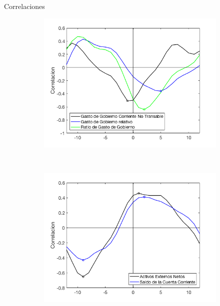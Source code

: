 \documentclass{beamer}
\begin{document}
\begin{frame}{Correlaciones}
\begin{figure}
\captionsetup[subfigure]{font=scriptsize,labelfont=scriptsize}
\centering
    \begin{subfigure}[b]{0.31\textwidth}
        \includegraphics[width=\textwidth]{fig14}
    \end{subfigure}
    ~ %
    \begin{subfigure}[b]{0.31\textwidth}
        \includegraphics[width=\textwidth]{fig15}
    \end{subfigure}
    ~ %

\end{figure}
\end{frame}
\end{document}
